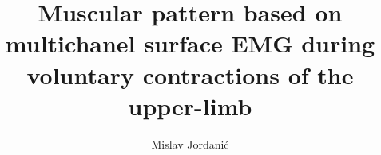 \documentclass[a4paper,twoside,11pt]{report}
\begin{document}
\title{\LARGE {\bf Muscular pattern based on multichanel surface EMG during voluntary contractions of the upper-limb}\\
 \vspace*{6mm}
}

\author{Mislav Jordani\'{c}}

\normallinespacing
\maketitle

\preface

%
%
%
%

\body








\newpage



\appendix

\end{document}
